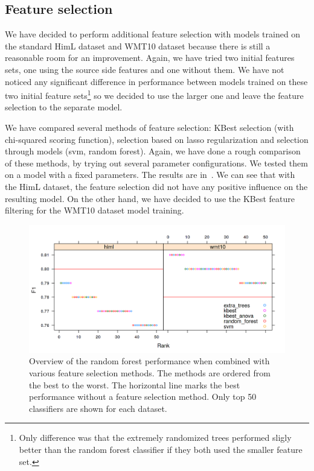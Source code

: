 \subsection{Feature selection}

We have decided to perform additional feature selection with models trained on the standard HimL dataset
and WMT10 dataset because there is still a reasonable room for an improvement. Again, we have tried two initial features
sets, one using the source side features and one without them. We have not noticed any significant difference in performance
between models trained on these two initial feature sets\footnote{Only difference was that the extremely randomized
trees performed sligly better than the random forest classifier if they both used the smaller feature set.} so we decided to use the larger one and leave
the feature selection to the separate model.

We have compared several methods of feature selection: KBest selection
(with chi-squared scoring function), selection based on lasso regularization and selection through
models (svm, random forest). Again, we have done a rough comparison of these methods, by trying out
several parameter configurations. We tested them on a model with a fixed parameters. The results
are in~. We can see that with the HimL dataset, the feature selection did not have
any positive influence on the resulting model. On the other hand, we have decided to use the KBest
feature filtering for the WMT10 dataset model training.

\begin{figure}
\centering
  \includegraphics[scale=0.7]{cat-sel}
  \caption{
    Overview of the random forest performance when combined with various feature selection methods.
The methods are ordered from the best to the worst. The horizontal line marks the best performance without
a feature selection method. Only top 50 classifiers are shown for each dataset.
}
  \label{cats-sel}
\end{figure}

